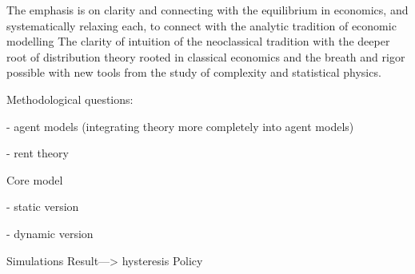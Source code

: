 
The emphasis is on clarity and connecting with the equilibrium in economics, and systematically relaxing each, to connect with the analytic tradition of economic modelling
The clarity of intuition of the neoclassical tradition with the deeper root of distribution theory rooted in classical economics and the breath and rigor possible with new tools from the study of complexity and statistical physics.

Methodological questions: 

    - agent models (integrating theory more completely into agent models)
    
    - rent theory

Core model

    - static version
    
    - dynamic version

Simulations
Result---> hysteresis
Policy
